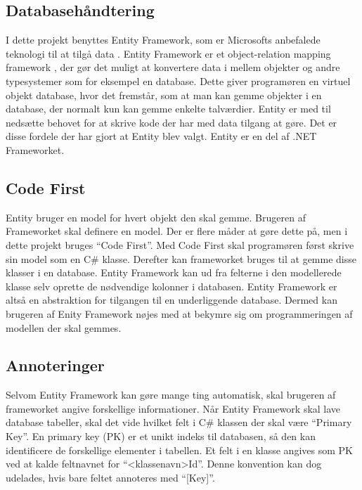 \subsection{Databasehåndtering}
\label{sec:database}
I dette projekt benyttes Entity Framework, som er Microsofts anbefalede teknologi til at tilgå data \cite{entity}. Entity Framework er et object-relation mapping framework \cite{lerman2010programming}, der gør det muligt at konvertere data i mellem objekter og andre typesystemer som for eksempel en database. Dette giver programøren en virtuel objekt database, hvor det fremstår, som at man kan gemme objekter i en database, der normalt kun kan gemme enkelte talværdier. Entity er med til nedsætte behovet for at skrive kode der har med data tilgang at gøre. Det er disse fordele der har gjort at Entity blev valgt. Entity er en del af .NET Frameworket.



\subsection{Code First}
\label{sub:code_first}
Entity bruger en model for hvert objekt den skal gemme. Brugeren af Frameworket skal definere en model. Der er flere måder at gøre dette på, men i dette projekt bruges \enquote{Code First}. Med Code First skal programøren først skrive sin model som en C\# klasse. Derefter kan frameworket bruges til at gemme disse klasser i en database. Entity Framework kan ud fra felterne i den modellerede klasse selv oprette de nødvendige kolonner i databasen. Entity Framework er altså en abstraktion for tilgangen til en underliggende database. Dermed kan brugeren af Enity Framework nøjes med at bekymre sig om programmeringen af modellen der skal gemmes.

\subsection{Annoteringer}
\label{sub:annoteringer}
Selvom Entity Framework kan gøre mange ting automatisk, skal brugeren af frameworket angive forskellige informationer. Når Entity Framework skal lave database tabeller, skal det vide hvilket felt i C\# klassen der skal være \enquote{Primary Key}. En primary key (PK) er et unikt indeks til databasen, så den kan identificere de forskellige elementer i tabellen. Et felt i en klasse angives som PK ved at kalde feltnavnet for \enquote{<klassenavn>Id}. Denne konvention kan dog udelades, hvis bare feltet annoteres med \enquote{[Key]}.

